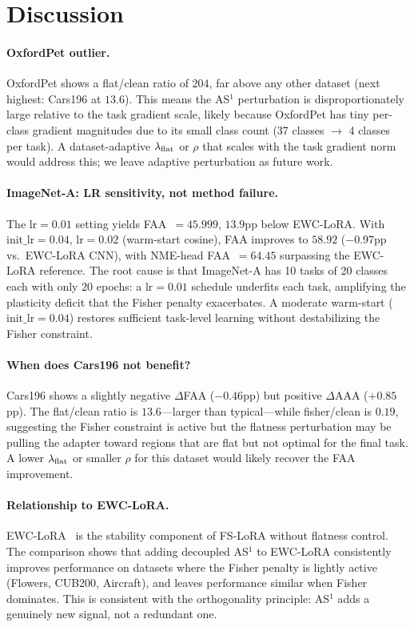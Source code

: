 \section{Discussion}
\label{sec:discussion}

\paragraph{OxfordPet outlier.}
OxfordPet shows a flat/clean ratio of $204$, far above any other dataset (next highest: Cars196 at $13.6$).
This means the AS$^1$ perturbation is disproportionately large relative to the task gradient scale,
likely because OxfordPet has tiny per-class gradient magnitudes due to its small class count
(37 classes $\to$ 4 classes per task).
A dataset-adaptive $\lambda_{\mathrm{flat}}$ or $\rho$ that scales with the task gradient norm would address this;
we leave adaptive perturbation as future work.

\paragraph{ImageNet-A: LR sensitivity, not method failure.}
The $\mathrm{lr}=0.01$ setting yields FAA~$=45.999$, $13.9$pp below EWC-LoRA.
With $\mathrm{init\_lr}=0.04$, $\mathrm{lr}=0.02$ (warm-start cosine), FAA improves to $58.92$
($-0.97$pp vs.\ EWC-LoRA CNN), with NME-head FAA~$=64.45$ surpassing the EWC-LoRA reference.
The root cause is that ImageNet-A has 10 tasks of 20 classes each with only 20 epochs:
a $\mathrm{lr}=0.01$ schedule underfits each task, amplifying the plasticity deficit
that the Fisher penalty exacerbates.
A moderate warm-start ($\mathrm{init\_lr}=0.04$) restores sufficient task-level learning
without destabilizing the Fisher constraint.

\paragraph{When does Cars196 not benefit?}
Cars196 shows a slightly negative $\Delta$FAA ($-0.46$pp) but positive $\Delta$AAA ($+0.85$pp).
The flat/clean ratio is $13.6$---larger than typical---while fisher/clean is $0.19$,
suggesting the Fisher constraint is active but the flatness perturbation may be pulling the
adapter toward regions that are flat but not optimal for the final task.
A lower $\lambda_{\mathrm{flat}}$ or smaller $\rho$ for this dataset would likely recover the FAA improvement.

\paragraph{Relationship to EWC-LoRA.}
EWC-LoRA~\citep{zheng2025ewclora} is the stability component of FS-LoRA without flatness control.
The comparison shows that adding decoupled AS$^1$ to EWC-LoRA consistently improves
performance on datasets where the Fisher penalty is lightly active (Flowers, CUB200, Aircraft),
and leaves performance similar when Fisher dominates.
This is consistent with the orthogonality principle: AS$^1$ adds a genuinely new signal,
not a redundant one.

